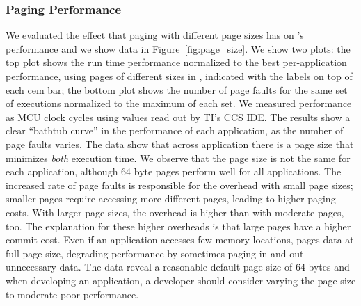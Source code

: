 

\subsubsection{\sys Paging Performance}
\label{sec:results_memory_management}

We evaluated the effect that paging with different page sizes has on \sys's
performance and we show data in Figure~\ref{fig:page_size}. We show two plots:
the top plot shows the run time performance normalized to the best
per-application performance, using pages of different sizes in \sys, indicated
with the labels on top of each cem bar; the bottom plot shows the number of
page faults for the same set of executions normalized to the maximum of each
set.
%
We measured performance as MCU clock cycles using values read out by TI's CCS
IDE. 
%
The results show a clear ``bathtub curve'' in the performance of each
application, as the number of page faults varies. The data show that across
application there is a page size that minimizes \emph{both} execution time.  We
observe that the page size is not the same for each application, although 64
byte pages perform well for all applications. The increased rate of
page faults is responsible for the overhead with small page sizes; smaller
pages require accessing more different pages, leading to higher paging costs.
With larger page sizes, the overhead is higher than with moderate pages, too.
The explanation for these higher overheads is that large pages have a higher
commit cost. Even if an application accesses few memory locations, \sys pages
data at full page size, degrading performance by sometimes paging in and out
unnecessary data.  The data reveal a reasonable default page size of 64 bytes
and when developing an application, a developer should consider varying the
page size to moderate poor performance.


